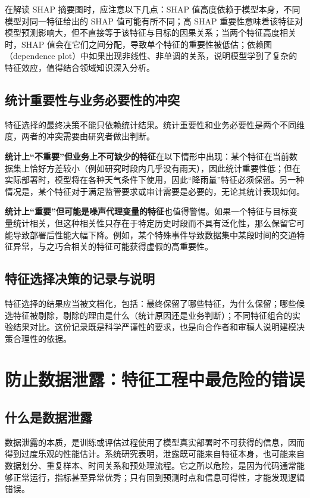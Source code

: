 在解读 SHAP 摘要图时，应注意以下几点：SHAP 值高度依赖于模型本身，不同模型对同一特征给出的 SHAP 值可能有所不同；高 SHAP 重要性意味着该特征对模型预测影响大，但不直接等于该特征与目标的因果关系；当两个特征高度相关时，SHAP 值会在它们之间分配，导致单个特征的重要性被低估；依赖图（dependence plot）中如果出现非线性、非单调的关系，说明模型学到了复杂的特征效应，值得结合领域知识深入分析。

\subsection{统计重要性与业务必要性的冲突}

特征选择的最终决策不能只依赖统计结果。统计重要性和业务必要性是两个不同维度，两者的冲突需要由研究者做出判断。

\textbf{统计上“不重要”但业务上不可缺少的特征}在以下情形中出现：某个特征在当前数据集上恰好方差较小（例如研究时段内几乎没有雨天），因此统计重要性低；但在实际部署时，模型将在各种天气条件下使用，因此“降雨量”特征必须保留。另一种情况是，某个特征对于满足监管要求或审计需要是必要的，无论其统计表现如何。

\textbf{统计上“重要”但可能是噪声代理变量的特征}也值得警惕。如果一个特征与目标变量统计相关，但这种相关性只存在于特定历史时段而不具有泛化性，那么保留它可能导致部署后性能大幅下降。例如，某个特殊事件导致数据集中某段时间的交通特征异常，与之巧合相关的特征可能获得虚假的高重要性。

\subsection{特征选择决策的记录与说明}

特征选择的结果应当被文档化，包括：最终保留了哪些特征，为什么保留；哪些候选特征被剔除，剔除的理由是什么（统计原因还是业务判断）；不同特征组合的实验结果对比。这份记录既是科学严谨性的要求，也是向合作者和审稿人说明建模决策合理性的依据。


\section{防止数据泄露：特征工程中最危险的错误}

\subsection{什么是数据泄露}

数据泄露的本质，是训练或评估过程使用了模型真实部署时不可获得的信息，因而得到过度乐观的性能估计。系统研究表明，泄露既可能来自特征本身，也可能来自数据划分、重复样本、时间关系和预处理流程\cite{kaufman2012leakage}。它之所以危险，是因为代码通常能够正常运行，指标甚至异常优秀；只有回到预测时点和信息可得性，才能发现逻辑错误。

